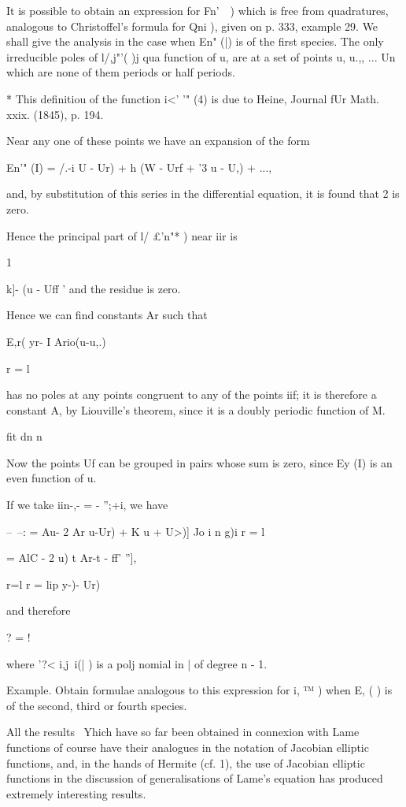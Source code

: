 {{{{{{{It is possible to obtain an expression for Fn'\ \ ) which is free from
quadratures, analogous to Christoffel's formula for Qni ), given on p.
333, example 29. We shall give the analysis in the case when En" (|)
is of the first species. The only irreducible poles of l/,j"'( )j qua
function of u, are at a set of points u, u.,, ... Un which are none
of them periods or half periods.

* This definitiou of the function i<' '" (4) is due to Heine, Journal
fUr Math. xxix. (1845), p. 194.

%
%

Near any one of these points we have an expansion of the form

En'" (I) = /.-i U - Ur) + h (W - Urf + '3 u - U,) + ...,

and, by substitution of this series in the differential equation, it
is found that 2 is zero.

Hence the principal part of l/ £'n"* ) near iir is

1

k]- (u - Uff ' and the residue is zero.

Hence we can find constants Ar such that

 E,r( yr- I Ario(u-u,.)

r = l

has no poles at any points congruent to any of the points iif; it is
therefore a constant A, by Liouville's theorem, since it is a doubly
periodic function of M.

fit dn n

Now the points Uf can be grouped in pairs whose sum is zero, since Ey
(I) is an even function of u.

If we take iin-,- = - '';+i, we have

--~--: = Au- 2 Ar u-Ur) + K u + U>)] Jo i n g)i r = l

= AlC - 2 u) t Ar-t - ff' ''],

r=l r = lip y-)- Ur)

and therefore

? = !

where '?< i,j\ i(| ) is a polj nomial in | of degree n - 1.

Example. Obtain formulae analogous to this expression for i, ™ ) when
E, ( ) is of the second, third or fourth species.


All the results \ Yhich have so far been obtained in connexion with
Lame functions of course have their analogues in the notation of
Jacobian elliptic functions, and, in the hands of Hermite (cf.
1), the use of Jacobian elliptic functions in the discussion of
generalisations of Lame's equation has produced extremely interesting
results.

}}}}}}}
